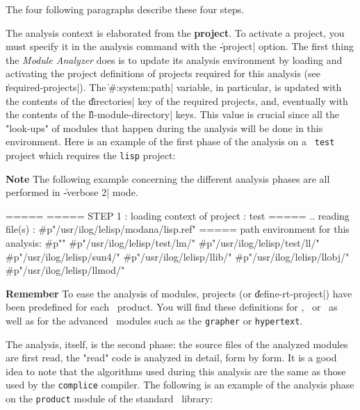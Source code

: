 The four following paragraphs describe these four steps. 

The analysis context is elaborated from the {\bf project}.
To activate a project, you must specify it in the analysis command with the \|-project| option.
The first thing the {\em Module Analyzer} does is to update its analysis environment by loading and activating the project definitions of projects required for this analysis (see \|required-projects|).
The \|#:system:path| variable, in particular, is updated with the contents of the \|directories| key of the required projects, and, eventually with the contents of the \|ll-module-directory| keys.  This value is crucial since all the "look-ups" of modules that happen during the analysis will be done in this environment. 
Here is an example of the first phase of the analysis on a {\tt
test} project which requires the {\tt lisp} project:
\begin{Side}{\bf Note}
The following example concerning the different analysis phases are all performed in \|-verbose 2| mode. 
\end{Side}
\begin{Longcode*}
=====
===== STEP 1 : loading context of project : test
=====
.. reading file(s) : #p"/usr/ilog/lelisp/modana/lisp.ref"
===== path environment for this analysis:
   #p""
   #p"/usr/ilog/lelisp/test/lm/"
   #p"/usr/ilog/lelisp/test/ll/"
   #p"/usr/ilog/lelisp/sun4/"
   #p"/usr/ilog/lelisp/llib/"
   #p"/usr/ilog/lelisp/llobj/"
   #p"/usr/ilog/lelisp/llmod/"
\end{Longcode*}

\begin{Side}{\bf Remember}
To ease the analysis of modules, projects (or \|define-rt-project|)
have been predefined for each \Ilog\  product.  You will find these
definitions for \LeLisp, \Aida\ or \Smeci\ as well as 
for the advanced \Aida\ modules such as the {\tt grapher} 
or {\tt hypertext}.
\end{Side}



The analysis, itself, is the second phase:  the source files of the analyzed modules are first read, the "read" code is analyzed in detail, form by form.  It is a good idea to note that the algorithms used during this analysis are the same as those used by the {\tt complice} compiler.  The following is an example of the analysis phase on the {\tt product} module of the standard \LeLisp\ library:  

